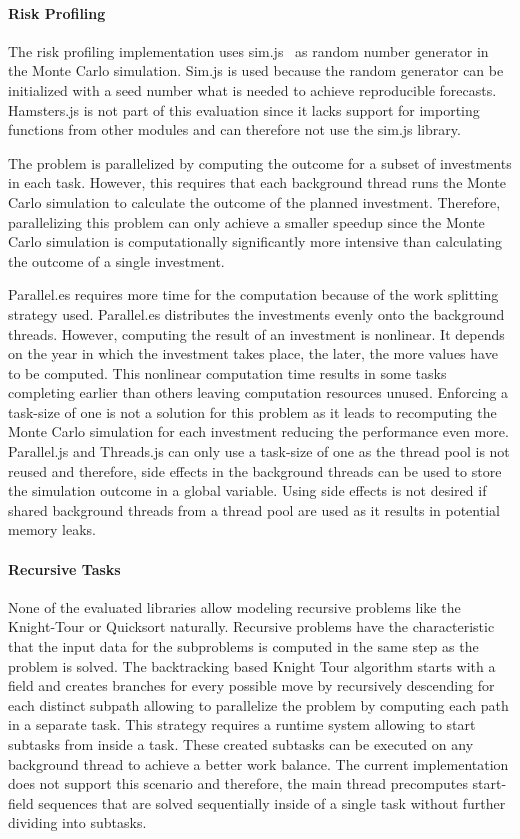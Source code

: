 \paragraph{Risk Profiling}
The risk profiling implementation uses sim.js~\cite{simjs} as random number generator in the Monte Carlo simulation. Sim.js is used because the random generator can be initialized with a seed number what is needed to achieve reproducible forecasts. Hamsters.js is not part of this evaluation since it lacks support for importing functions from other modules and can therefore not use the sim.js library. 

The problem is parallelized by computing the outcome for a subset of investments in each task. However, this requires that each background thread runs the Monte Carlo simulation to calculate the outcome of the planned investment. Therefore, parallelizing this problem can only achieve a smaller speedup since the Monte Carlo simulation is computationally significantly more intensive than calculating the outcome of a single investment.

Parallel.es requires more time for the computation because of the work splitting strategy used. Parallel.es distributes the investments evenly onto the background threads. However, computing the result of an investment is nonlinear. It depends on the year in which the investment takes place, the later, the more values have to be computed. This nonlinear computation time results in some tasks completing earlier than others leaving computation resources unused. Enforcing a task-size of one is not a solution for this problem as it leads to recomputing the Monte Carlo simulation for each investment reducing the performance even more. Parallel.js and Threads.js can only use a task-size of one as the thread pool is not reused and therefore, side effects in the background threads can be used to store the simulation outcome in a global variable. Using side effects is not desired if shared background threads from a thread pool are used as it results in potential memory leaks.

\paragraph{Recursive Tasks} 
None of the evaluated libraries allow modeling recursive problems like the Knight-Tour or Quicksort naturally. Recursive problems have the characteristic that the input data for the subproblems is computed in the same step as the problem is solved. The backtracking based Knight Tour algorithm starts with a field and creates branches for every possible move by recursively descending for each distinct subpath allowing to parallelize the problem by computing each path in a separate task. This strategy requires a runtime system allowing to start subtasks from inside a task. These created subtasks can be executed on any background thread to achieve a better work balance. The current implementation does not support this scenario and therefore, the main thread precomputes start-field sequences that are solved sequentially inside of a single task without further dividing into subtasks.


